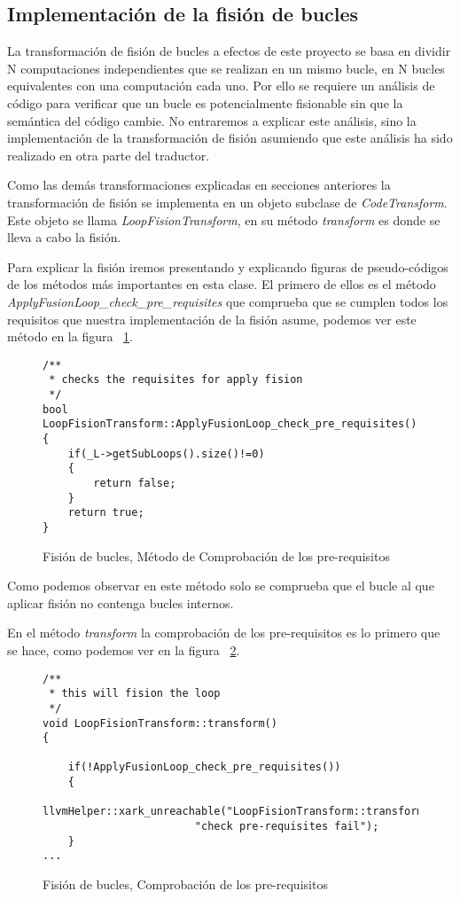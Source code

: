 \subsection{Implementación de la fisión de bucles}

La transformación de fisión de bucles a efectos de este proyecto se basa en dividir N computaciones independientes que se realizan en un mismo bucle, en N bucles equivalentes con una computación cada uno. Por ello se requiere un análisis de código para verificar que un bucle es potencialmente fisionable sin que la semántica del código cambie. No entraremos a explicar este análisis, sino la implementación de la transformación de fisión asumiendo que este análisis ha sido realizado en otra parte del traductor.

Como las demás transformaciones explicadas en secciones anteriores la transformación de fisión se implementa en un objeto subclase de \textit{CodeTransform}. Este objeto se llama \textit{LoopFisionTransform}, en su método \textit{transform} es donde se lleva a cabo la fisión.

Para explicar la fisión iremos presentando y explicando figuras de pseudo-códigos de los métodos más importantes en esta clase. El primero de ellos es el método \textit{ApplyFusionLoop\_check\_pre\_requisites} que comprueba que se cumplen todos los requisitos que nuestra implementación de la fisión asume, podemos ver este método en la figura ~\ref{FIG:LoopFisionCheckMethod}.

\begin{figure}[t]
\begin{lstlisting}
/**
 * checks the requisites for apply fision
 */
bool LoopFisionTransform::ApplyFusionLoop_check_pre_requisites()
{
	if(_L->getSubLoops().size()!=0)
	{
		return false;
	}
	return true;
}
\end{lstlisting}
\caption{Fisión de bucles, Método de Comprobación de los pre-requisitos}
\label{FIG:LoopFisionCheckMethod}
\end{figure}

Como podemos observar en este método solo se comprueba que el bucle al que aplicar fisión no contenga bucles internos.

En el método \textit{transform} la comprobación de los pre-requisitos es lo primero que se hace, como podemos ver en la figura ~\ref{FIG:LoopFisionCheck}.

\begin{figure}[t]
\begin{lstlisting}
/**
 * this will fision the loop
 */
void LoopFisionTransform::transform()
{

	if(!ApplyFusionLoop_check_pre_requisites())
	{
		llvmHelper::xark_unreachable("LoopFisionTransform::transform()"
						"check pre-requisites fail");
	}
...
\end{lstlisting}
\caption{Fisión de bucles, Comprobación de los pre-requisitos}
\label{FIG:LoopFisionCheck}
\end{figure}

